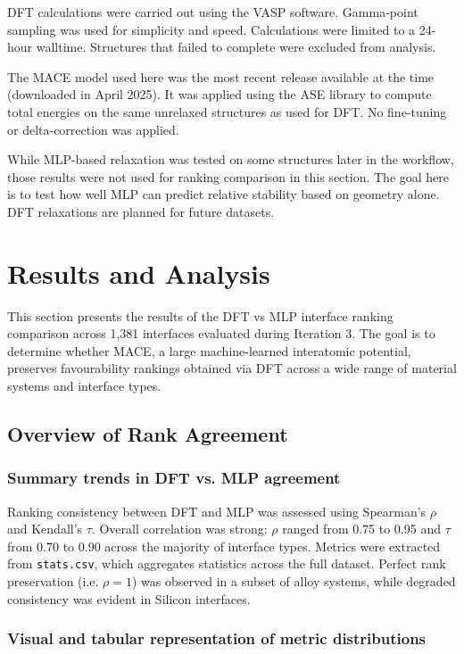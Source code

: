 DFT calculations were carried out using the VASP software. Gamma-point sampling was used for simplicity and speed. Calculations were limited to a 24-hour walltime. Structures that failed to complete were excluded from analysis.

The MACE model used here was the most recent release available at the time (downloaded in April 2025). It was applied using the ASE library to compute total energies on the same unrelaxed structures as used for DFT. No fine-tuning or delta-correction was applied.

While MLP-based relaxation was tested on some structures later in the workflow, those results were not used for ranking comparison in this section. The goal here is to test how well MLP can predict relative stability based on geometry alone. DFT relaxations are planned for future datasets.

\section{Results and Analysis} \label{section:results_and_analysis}

This section presents the results of the DFT vs MLP interface ranking comparison across 1,381 interfaces evaluated during Iteration 3. The goal is to determine whether MACE, a large machine-learned interatomic potential, preserves favourability rankings obtained via DFT across a wide range of material systems and interface types.

\subsection{Overview of Rank Agreement}

\subsubsection{Summary trends in DFT vs. MLP agreement}

Ranking consistency between DFT and MLP was assessed using Spearman's $\rho$ and Kendall's $\tau$. Overall correlation was strong: $\rho$ ranged from 0.75 to 0.95 and $\tau$ from 0.70 to 0.90 across the majority of interface types. Metrics were extracted from \texttt{stats.csv}, which aggregates statistics across the full dataset. Perfect rank preservation (i.e. $\rho = 1$) was observed in a subset of alloy systems, while degraded consistency was evident in Silicon interfaces.

\subsubsection{Visual and tabular representation of metric distributions}

